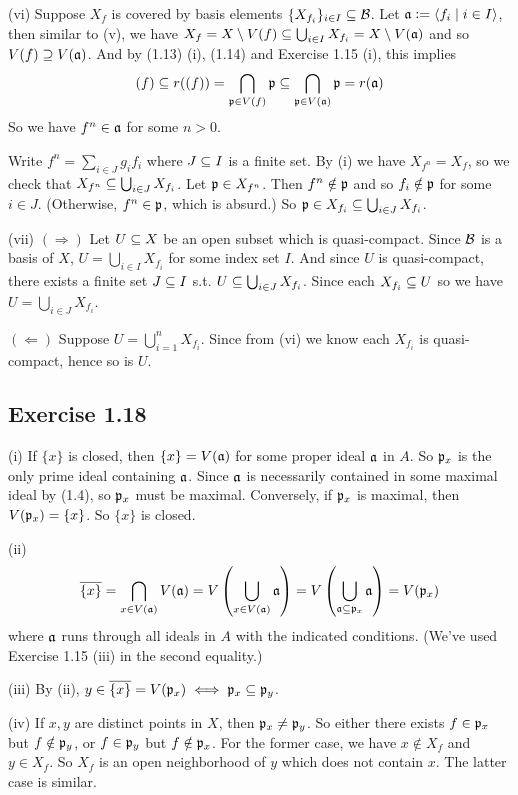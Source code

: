 \documentclass[../A&M.tex]{subfiles}
\begin{document}
(vi) Suppose $X_f$ is covered by basis elements $\{X_{f_i}\}_{i\in I} \subseteq \mathcal{B}$. Let $\mathfrak{a}:=\langle f_i \mid i\in I \rangle$, then similar to (v), we have $X_f = X\setminus V(f) \subseteq \bigcup_{i\in I} X_{f_i} = X\setminus V(\mathfrak{a})$ and so $V(f)\supseteq V(\mathfrak{a})$. And by (1.13) (i), (1.14) and Exercise 1.15 (i), this implies
$$
(f) \subseteq r((f)) = \bigcap_{\mathfrak{p}\in V(f)} \mathfrak{p} \subseteq \bigcap_{\mathfrak{p}\in V(\mathfrak{a})} \mathfrak{p} = r(\mathfrak{a})
$$
So we have $f^n\in\mathfrak{a}$ for some $n>0$.

Write $f^n=\sum_{i\in J} g_if_i$ where $J\subseteq I$ is a finite set. By (i) we have $X_{f^n} = X_f$, so we check that $X_{f^n} \subseteq \bigcup_{i\in J} X_{f_i}$. Let $\mathfrak{p}\in X_{f^n}$. Then $f^n\notin\mathfrak{p}$ and so $f_i\notin \mathfrak{p}$ for some $i\in J$. (Otherwise, $f^n\in \mathfrak{p}$, which is absurd.) So $\mathfrak{p}\in X_{f_i} \subseteq \bigcup_{i\in J} X_{f_i}$.

(vii) $(\Rightarrow)$ Let $U\subseteq X$ be an open subset which is quasi-compact. Since $\mathcal{B}$ is a basis of $X$, $U=\bigcup_{i\in I} X_{f_i}$ for some index set $I$. And since $U$ is quasi-compact, there exists a finite set $J\subseteq I$ s.t. $U\subseteq \bigcup_{i\in J} X_{f_i}$. Since each $X_{f_i} \subseteq U$ so we have $U = \bigcup_{i\in J} X_{f_i}$.

$(\Leftarrow)$ Suppose $U = \bigcup_{i=1}^n X_{f_i}$. Since from (vi) we know each $X_{f_i}$ is quasi-compact, hence so is $U$.

\subsection*{Exercise 1.18}

(i) If $\{x\}$ is closed, then $\{x\}=V(\mathfrak{a})$ for some proper ideal $\mathfrak{a}$ in $A$. So $\mathfrak{p}_x$ is the only prime ideal containing $\mathfrak{a}$. Since $\mathfrak{a}$ is necessarily contained in some maximal ideal by (1.4), so $\mathfrak{p}_x$ must be maximal. Conversely, if $\mathfrak{p}_x$ is maximal, then $V(\mathfrak{p}_x)=\{x\}$. So $\{x\}$ is closed.

(ii)
$$
\overline{\{x\}} = \bigcap_{x\in V(\mathfrak{a})} V(\mathfrak{a}) = V\left( \bigcup_{x\in V(\mathfrak{a})} \mathfrak{a} \right) = V\left( \bigcup_{\mathfrak{a}\subseteq \mathfrak{p}_x} \mathfrak{a} \right) = V(\mathfrak{p}_x)
$$
where $\mathfrak{a}$ runs through all ideals in $A$ with the indicated conditions. (We've used Exercise 1.15 (iii) in the second equality.)

(iii) By (ii), $y\in\overline{\{x\}} = V(\mathfrak{p}_x) \iff \mathfrak{p}_x \subseteq \mathfrak{p}_y$.

(iv) If $x,y$ are distinct points in $X$, then $\mathfrak{p}_x\neq\mathfrak{p}_y$. So either there exists $f\in\mathfrak{p}_x$ but $f\notin\mathfrak{p}_y$, or $f\in\mathfrak{p}_y$ but $f\notin\mathfrak{p}_x$. For the former case, we have $x\notin X_f$ and $y\in X_f$. So $X_f$ is an open neighborhood of $y$ which does not contain $x$. The latter case is similar.
\end{document}
